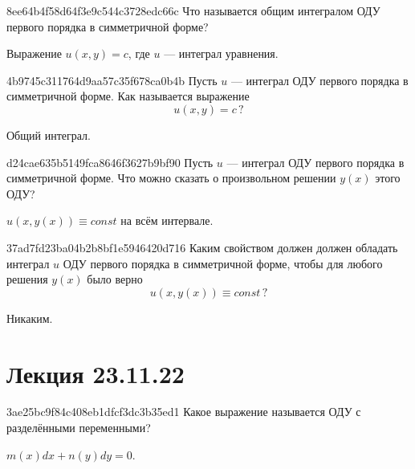 \begin{note}{8ee64b4f58d64f3e9c544c3728edc66c}
    Что называется общим интегралом ОДУ первого порядка в симметричной форме?

    \begin{cloze}{1}
        Выражение \({ u(x, y) = c }\), где \({ u }\) --- интеграл уравнения.
    \end{cloze}
\end{note}

\begin{note}{4b9745c311764d9aa57c35f678ca0b4b}
    Пусть \({ u }\) --- интеграл ОДУ первого порядка в симметричной форме.
    Как называется выражение
    \[
        u(x, y) = c\,?
    \]

    \begin{cloze}{1}
        Общий интеграл.
    \end{cloze}
\end{note}

\begin{note}{d24cae635b5149fca8646f3627b9bf90}
    Пусть \({ u }\) --- интеграл ОДУ первого порядка в симметричной форме.
    Что можно сказать о произвольном решении \({ y(x) }\) этого ОДУ?

    \begin{cloze}{1}
        \({ u(x, y(x)) \equiv const }\) на всём интервале.
    \end{cloze}
\end{note}

\begin{note}{37ad7fd23ba04b2b8bf1e5946420d716}
    Каким свойством должен должен обладать интеграл \({ u }\) ОДУ первого порядка в симметричной форме, чтобы для любого решения \({ y(x) }\) было верно
    \[
        u(x, y(x)) \equiv const\,?
    \]

    \begin{cloze}{1}
        Никаким.
    \end{cloze}
\end{note}

\section{Лекция 23.11.22}
\begin{note}{3ae25bc9f84c408eb1dfcf3dc3b35ed1}
    Какое выражение называется ОДУ с разделёнными переменными?

    \begin{cloze}{1}
        \({ m(x) dx + n(y) dy = 0 }\).
    \end{cloze}
\end{note}

